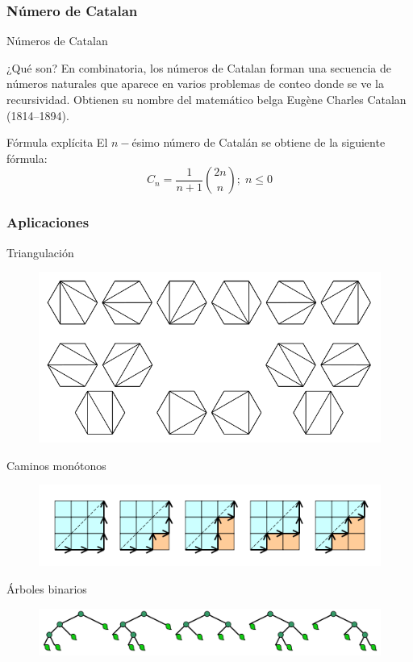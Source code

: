 \documentclass[spanish, utf8,handout]{beamer} %
\theoremstyle{definition}
\begin{document}
\subsubsection{Número de Catalan}
\begin{frame}{Números de Catalan}
\begin{block}{¿Qué son?}
	En combinatoria, los números de Catalan forman una secuencia de números naturales que aparece en varios problemas de conteo donde se ve la recursividad. Obtienen su nombre del matemático belga Eugène Charles Catalan (1814–1894).
\end{block}
\begin{block}{Fórmula explícita}
	El $ n- $ésimo número de Catalán se obtiene de la siguiente fórmula:
	$$
	C_{n}=\frac{1}{n+1}\binom{2n}{n}; \; n \leq 0
	$$
\end{block}

\end{frame}
\begin{frame}
	\frametitle{Aplicaciones}
		\begin{block}{Triangulación}
		\begin{figure}
			\centering
			\includegraphics[scale=0.15]{ca1}
		\end{figure}
	\end{block}
	\begin{block}{Caminos monótonos}
		\begin{figure}
			\centering
			\includegraphics[scale=0.25]{ca2}
		\end{figure}
	\end{block}
\begin{block}{Árboles binarios}
	\begin{figure}
	\centering
	\includegraphics[scale=0.09]{ca3}
	\end{figure}
\end{block}
\end{frame}
\end{document}
